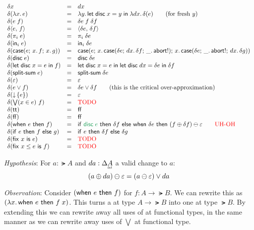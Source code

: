 \documentclass{article}
\begin{document}
\[
\begin{array}{lcll}
  \delta x &=& dx\\
  \delta(\fn\bind{x} e) &=& \fn\bind{y} \letdisc{x}{y} {\fn\bind{dx} \delta(e)}
  \qquad\text{(for fresh $y$)}\\
  \delta(e\;f) &=& \delta e \; f \; \delta f\\
  \delta \pair{e}{f} &=& \pair{\delta{e}}{\delta{f}}\\
  \delta(\pi_i\; e) &=& \pi_i\; \delta{e}\\
  \delta(\inj{i}{e}) &=& \inj{i}{\delta{e}}\\
  \delta(\case{e}{x}{f}{x}{g})
  &=& \case{e}
        {x}{\case{\delta e}{dx}{\delta f}{\_}{\ms{abort!}}}
        {x}{\case{\delta e}{\_}{\ms{abort!}}{dx}{\delta g}}\\
  \delta(\disc e) &=& \disc{\delta e}\\
  \delta(\letdisc{x}{e}{f}) &=&
  \letdisc{x}{e}{
    \letdisc{dx}{\delta e}{\delta f}}\\
  \delta(\splitsum{e}) &=&
  \splitsum{\delta e}\\
  \delta(\unit) &=& \unit\\
  \delta(e \vee f) &=& \delta e \vee \delta f
  \qquad \text{(this is the critical over-approximation)}\\
  \delta(\downintro{e}) &=& \unit\\
  \delta(\downelim{x}{e}{f}) &=& \text{\TODO}\\
  \delta(\ett) &=& \eff\\
  \delta(\eff) &=& \eff\\
  \delta(\when{e}{f})
  &=& \ifthen{\color{ForestGreen} \disc{e}}{\delta f}{
    \when{\delta e}{(f \oplus \delta f) \ominus \unit}}
  \qquad \text{\color{red} UH-OH}\\
  \delta(\ifthen{e}{f}{g}) &=& \ifthen{e}{\delta f}{\delta g}\\
  \delta(\fix{x}{e}) &=& \text{\TODO}\\
  \delta(\fixle{x}{e}{f}) &=& \text{\TODO}
\end{array}
\]

\emph{Hypothesis}: For $a : \lat{A}$ and $da : \GD\lat{A}$ a valid change to
$a$:
\begin{equation*}
  (a \oplus da) \ominus \varepsilon = (a \ominus \varepsilon)
  \vee da
\end{equation*}

\emph{Observation}: Consider $(\mathsf{when}~{e}~\mathsf{then}~{f})$ for $f : A \to \lat{B}$. We can
rewrite this as $(\lambda x.\, \mathsf{when}~{e}~\mathsf{then}~{f\; x})$. This turns a  at type
$A \to \lat{B}$ into one at type $\lat{B}$. By extending this we can rewrite
away all uses of  at functional types, in the same manner as we can
rewrite away uses of $\bigvee$ at functional type.

\end{document}
